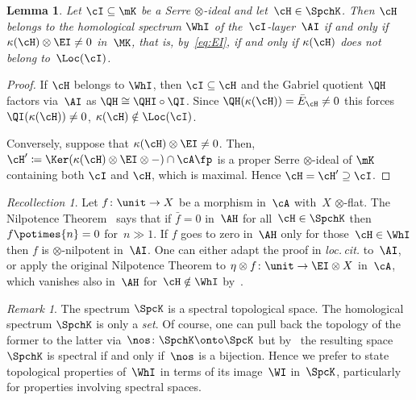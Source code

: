 \documentclass[11pt]{amsart}
\numberwithin{equation}{section} %
\theoremstyle{plain}
\newtheorem{lem}[equation]{Lemma}
\theoremstyle{definition}
\theoremstyle{remark}
\newtheorem{rec}[equation]{Recollection}
\newtheorem{rem}[equation]{Remark}
\begin{document}
%
\begin{lem}
\label{lem:H-in-Spch(A/I)}%
Let $\cI\subseteq \mK$ be a Serre $\otimes$-ideal and let~$\cH\in\SpchK$. Then $\cH$ belongs to the homological spectrum $\WhI$ of the~$\cI$-layer~$\AI$ if and only if~$\kappa(\cH)\otimes\EI\neq 0$ in~$\MK$, that is, by~\eqref{eq:EI}, if and only if $\kappa(\cH)$ does not belong to~$\Loc(\cI)$.
\end{lem}
%
\begin{proof}
If $\cH$ belongs to $\WhI$, then $\cI \subseteq \cH$ and the Gabriel quotient $\QH$ factors via~$\AI$ as $\QH\cong \QHI\circ\QI$. Since $\QH(\kappa(\cH))=\bar{E}_{\cH}\neq 0$ this forces~$\QI(\kappa(\cH))\neq 0$, \ie $\kappa(\cH)\notin\Loc(\cI)$.

Conversely, suppose that $\kappa(\cH) \otimes \EI \neq 0$. Then, $\cH'\coloneq\Ker(\kappa(\cH) \otimes \EI\otimes -) \cap \cA\fp$ is a proper Serre $\otimes$-ideal of $\mK$ containing both $\cI$ and $\cH$, which is maximal. Hence $\cH=\cH'\supseteq\cI$. 
\end{proof}

%
\begin{rec}
\label{rec:nilpotence}%
Let $f\colon \unit\to X$ be a morphism in~$\cA$ with~$X$ $\otimes$-flat. 
The Nilpotence Theorem~\cite[Corollary 4.2]{Balmer20b} says that if $\bar f=0$ in~$\AH$ for all~$\cH\in \SpchK$ then $f\potimes{n}=0$ for~$n\gg1$.
If $f$ goes to zero in~$\AH$ only for those~$\cH\in \WhI$ then $f$ is $\otimes$-nilpotent in~$\AI$. One can either adapt the proof in \textsl{loc.\,cit.} to~$\AI$, or apply the original Nilpotence Theorem to $\eta\otimes f\colon \unit\to \EI\otimes X$ in~$\cA$, which vanishes also in~$\AH$ for~$\cH\notin\WhI$ by~.
\end{rec}

%
\begin{rem}
\label{rem:piV}%
The spectrum $\SpcK$ is a spectral topological space. The homological spectrum $\SpchK$ is only a \emph{set}. Of course, one can pull back the topology of the former to the latter via~$\nos\colon \SpchK\onto \SpcK$ but by~\cite[Proposition~4.5]{BarthelHeardSanders23a} the resulting space $\SpchK$ is spectral if and only if~$\nos$ is a bijection. Hence we prefer to state topological properties of~$\WhI$ in terms of its image~$\WI$ in~$\SpcK$, particularly for properties involving spectral spaces. 
\end{rem}
\end{document}
